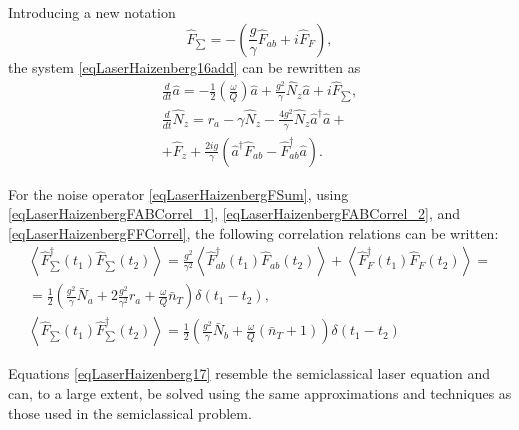 Introducing a new notation 
\begin{equation}
\hat{F}_{\sum} = - \left(\frac{g}{\gamma}\hat{F}_{ab} + i \hat{F}_F\right),
\label{eqLaserHaizenbergFSum}
\end{equation}
the system 
\eqref{eqLaserHaizenberg16add} can be rewritten as
\begin{eqnarray}
\frac{d}{dt} \hat{a} = -
\frac{1}{2}\left(\frac{\omega}{Q}\right)\hat{a} + \frac{g^2}{\gamma}
\hat{N}_z\hat{a} + i \hat{F}_{\sum},
\nonumber \\
\frac{d}{dt}\hat{N}_z = r_a -
\gamma\hat{N}_z - \frac{4g^2}{\gamma}
\hat{N}_z\hat{a}^{\dag}\hat{a} +
\nonumber \\
+ \hat{F}_z + \frac{2ig}{\gamma} \left(\hat{a}^{\dag}\hat{F}_{ab} -
\hat{F}_{ab}^{\dag}\hat{a}\right).
\label{eqLaserHaizenberg17}
\end{eqnarray}

For the noise operator \eqref{eqLaserHaizenbergFSum}, using
\eqref{eqLaserHaizenbergFABCorrel_1},
\eqref{eqLaserHaizenbergFABCorrel_2}, and
\eqref{eqLaserHaizenbergFFCorrel}, 
the following correlation relations can be written:
\begin{eqnarray}
\left<\hat{F}^{\dag}_{\sum}\left(t_1\right)\hat{F}_{\sum}\left(t_2\right)\right>
=
\frac{g^2}{\gamma^2}\left<\hat{F}^{\dag}_{ab}\left(t_1\right)\hat{F}_{ab}\left(t_2\right)\right>
+
\left<\hat{F}^{\dag}_{F}\left(t_1\right)\hat{F}_{F}\left(t_2\right)\right>
= 
\nonumber \\
= 
\frac{1}{2}
\left(
\frac{g^2}{\gamma}\bar{N}_a + 2 \frac{g^2}{\gamma^2}r_a + 
\frac{\omega}{Q}\bar{n}_T
\right)
\delta\left(t_1 - t_2\right),
\nonumber \\
\left<\hat{F}_{\sum}\left(t_1\right)\hat{F}^{\dag}_{\sum}\left(t_2\right)\right>
= \frac{1}{2}
\left(
\frac{g^2}{\gamma}\bar{N}_b + 
\frac{\omega}{Q}\left(\bar{n}_T + 1\right)
\right)
\delta\left(t_1 - t_2\right)
\label{eqLaserHaizenbergFSumCorrel}
\end{eqnarray}


Equations \eqref{eqLaserHaizenberg17} resemble the semiclassical
laser equation and can, to a large extent,
be solved using the same approximations and techniques as those
used in the semiclassical problem.